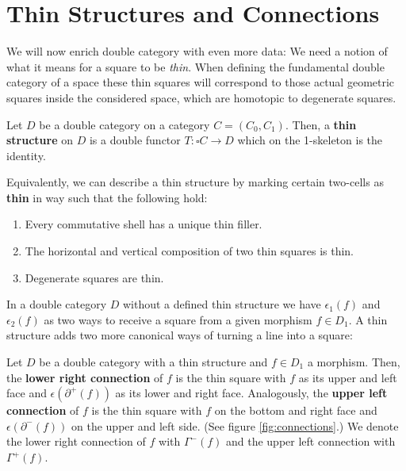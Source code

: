 \section{Thin Structures and Connections}

We will now enrich double category with even more data: We need a notion of
what it means for a square to be \emph{thin}.
When defining the fundamental double category of a space these thin squares will
correspond to those actual geometric squares inside the considered space, which are
homotopic to degenerate squares. %

\begin{defn} \label{def:thin-structure}
Let $D$ be a double category on a category $C = (C_0, C_1)$. Then, a \textbf{thin
structure} on $D$ is a double functor $T : \square C \to D$ which on the 1-skeleton
is the identity.

Equivalently, we can describe a thin structure by marking certain two-cells as
\textbf{thin} in way such that the following hold:
\begin{enumerate}
\item Every commutative shell has a unique thin filler.
\item The horizontal and vertical composition of two thin squares is thin.
\item Degenerate squares are thin.
\end{enumerate}
\end{defn}

In a double category $D$ without a defined thin structure we have
$\epsilon_1(f)$ and $\epsilon_2(f)$ as two ways to receive a square from a given
morphism $f \in D_1$. A thin structure adds two more canonical ways of turning
a line into a square:

\begin{defn} \label{def:connections}
Let $D$ be a double category with a thin structure and $f \in D_1$ a morphism.
Then, the \textbf{lower right connection} of $f$ is the thin square with $f$ 
as its upper and left face and $\epsilon(\partial^+(f))$ as its lower and right face.
Analogously, the \textbf{upper left connection} of $f$ is the thin square with
$f$ on the bottom and right face and $\epsilon(\partial^-(f))$ on the upper and
left side. (See figure \ref{fig:connections}.)
We denote the lower right connection of $f$ with $\Gamma^-(f)$ and the upper left
connection with $\Gamma^+(f)$.
\end{defn}

